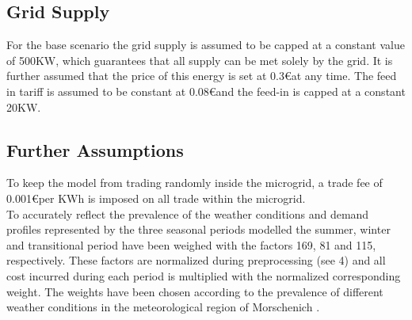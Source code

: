 \documentclass[
	11pt,								%
	DIV10,								%
	a4paper,         					%
	oneside,							%
	headheight=20pt,					%
	footheight=20pt,					%
    parskip=full,						%
    listof=totoc,						%
	bibliography=totoc,					%
	index=totoc,						%
]{scrartcl}
\begin{document}
\subsection{Grid Supply}
For the base scenario the grid supply is assumed to be capped at a constant value of 500KW, which guarantees that all supply can be met solely by the grid. It is further assumed that the price of this energy is set at 0.3\euro at any time\cite{bundesnetzagenturMonitoringbericht20182018}. The feed in tariff is assumed to be constant at 0.08\euro and the feed-in is capped at a constant 20KW.

\subsection{Further Assumptions}
To keep the model from trading randomly inside the microgrid, a trade fee of 0.001\euro per KWh is imposed on all trade within the microgrid.\\
To accurately reflect the prevalence of the weather conditions and demand profiles represented by the three seasonal periods modelled the summer, winter and transitional period have been weighed with the factors 169, 81 and 115, respectively. These factors are normalized during preprocessing (see 4) and all cost incurred during each period is multiplied with the normalized corresponding weight. The weights have been chosen according to the prevalence of different weather conditions in the meteorological region of Morschenich \cite{vereindeutscheringenieureReferenzlastprofileUndMehrfamilien2008}.
\end{document}
